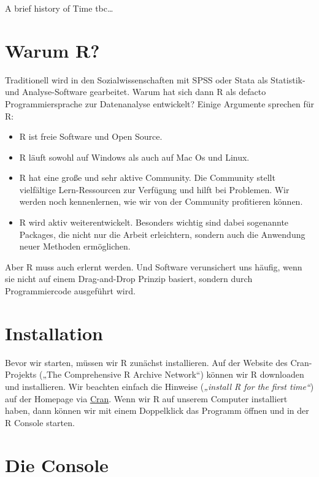 \documentclass[
]{book}
\providecommand{\tightlist}{%
  \setlength{\itemsep}{0pt}\setlength{\parskip}{0pt}}
\begin{document}
A brief history of Time tbc\ldots{}

\hypertarget{warum-r}{%
\section{Warum R?}\label{warum-r}}

Traditionell wird in den Sozialwissenschaften mit SPSS oder Stata als Statistik- und Analyse-Software gearbeitet. Warum hat sich dann R als defacto Programmiersprache zur Datenanalyse entwickelt? Einige Argumente sprechen für R:

\begin{itemize}
\tightlist
\item
  R ist freie Software und Open Source.
\item
  R läuft sowohl auf Windows als auch auf Mac Os und Linux.
\item
  R hat eine große und sehr aktive Community. Die Community stellt vielfältige Lern-Ressourcen zur Verfügung und hilft bei Problemen. Wir werden noch kennenlernen, wie wir von der Community profitieren können.
\item
  R wird aktiv weiterentwickelt. Besonders wichtig sind dabei sogenannte Packages, die nicht nur die Arbeit erleichtern, sondern auch die Anwendung neuer Methoden ermöglichen.
\end{itemize}

Aber R muss auch erlernt werden. Und Software verunsichert uns häufig, wenn sie nicht auf einem Drag-and-Drop Prinzip basiert, sondern durch Programmiercode ausgeführt wird.

\hypertarget{installation}{%
\section{Installation}\label{installation}}

Bevor wir starten, müssen wir R zunächst installieren. Auf der Website des Cran-Projekts („The Comprehensive R Archive Network``) können wir R downloaden und installieren. Wir beachten einfach die Hinweise (\emph{„install R for the first time``}) auf der Homepage via \href{https://cran.r-project.org/}{Cran}. Wenn wir R auf unserem Computer installiert haben, dann können wir mit einem Doppelklick das Programm öffnen und in der R Console starten.

\hypertarget{die-console}{%
\section{Die Console}\label{die-console}}
\end{document}
